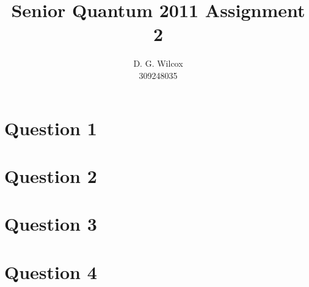 \documentclass[10pt,a4paper]{article}
\title{Senior Quantum 2011 Assignment 2}
\date{}
\author{D. G. Wilcox \\
		309248035}
\begin{document}
\maketitle
\section*{Question 1}


\section*{Question 2}

\section*{Question 3}
\section*{Question 4}
\end{document}
